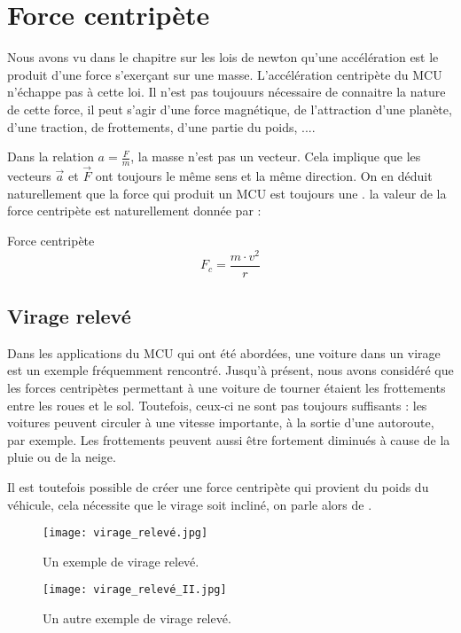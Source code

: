 \chapter{Force centripète}
Nous avons vu dans le chapitre sur les lois de newton qu'une accélération est le produit d'une force s'exerçant sur une masse. L'accélération centripète du MCU n'échappe pas à cette loi.
Il n'est pas toujouurs nécessaire de connaitre la nature de cette force, il peut s'agir d'une force magnétique, de l'attraction d'une planète, d'une traction, de frottements, d'une partie du poids, ....

Dans la relation \(a=\frac{F}{m}\), la masse n'est pas un vecteur. Cela implique que les vecteurs \(\vec{a}\) et \(\vec{F}\) ont toujours le même sens et la même direction. On en déduit naturellement que la force qui produit un MCU est toujours une .
la valeur de la force centripète est naturellement donnée par :
\begin{mytheo*}{Force centripète}
    \begin{equation}
        F_c=\frac{m \cdot v^2}{r}
    \end{equation}
\end{mytheo*}
\newpage

\section{Virage relevé}
Dans les applications du MCU qui ont été abordées, une voiture dans un virage est un exemple fréquemment rencontré. Jusqu'à présent, nous avons considéré que les forces centripètes permettant à une voiture de tourner étaient les frottements entre les roues et le sol. Toutefois, ceux-ci ne sont pas toujours suffisants : les voitures peuvent circuler à une vitesse importante, à la sortie d'une autoroute, par exemple. Les frottements peuvent aussi être fortement diminués à cause de la pluie ou de la neige.

Il est toutefois possible de créer une force centripète qui provient du poids du véhicule, cela nécessite que le virage soit incliné, on parle alors de .

\begin{figure}[h]
    \begin{minipage}{.5\textwidth}
        \centering
        \texttt{[image: virage\_relevé.jpg]}
        \caption{Un exemple de virage relevé.}
    \end{minipage}
    \begin{minipage}{.5\textwidth}
        \centering
        \texttt{[image: virage\_relevé\_II.jpg]}
        \caption{Un autre exemple de virage relevé.}
    \end{minipage}
\end{figure}

